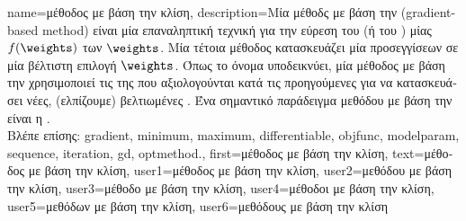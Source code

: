 {name={\foreignlanguage{greek}{μέθοδος με βάση την κλίση}}, 
	description={\foreignlanguage{greek}{Μία μέθοδς με βάση την} 
		 (gradient-based method) \foreignlanguage{greek}{είναι μία επαναληπτική τεχνική για την εύρεση του} 
		 (\foreignlanguage{greek}{ή του} ) \foreignlanguage{greek}{μίας} 
		  $f(\weights)$ \foreignlanguage{greek}{των}  $\weights$. 
		\foreignlanguage{greek}{Μία τέτοια μέθοδος κατασκευάζει μία}  \foreignlanguage{greek}{προσεγγίσεων 
		σε μία βέλτιστη επιλογή} $\weights$. \foreignlanguage{greek}{Όπως το όνομα υποδεικνύει,} \foreignlanguage{greek}{μία μέθοδος με 
		βάση την}  \foreignlanguage{greek}{χρησιμοποιεί τις}  \foreignlanguage{greek}{της} 
		 \foreignlanguage{greek}{που αξιολογούνται κατά τις προηγούμενες}  
		\foreignlanguage{greek}{για να κατασκευάσει νέες, (ελπίζουμε) βελτιωμένες} . 
		\foreignlanguage{greek}{Ένα σημαντικό παράδειγμα μεθόδου με βάση την}  
		\foreignlanguage{greek}{είναι η} .
		\\
		\foreignlanguage{greek}{Βλέπε επίσης:} \gls{gradient}, \gls{minimum}, \gls{maximum}, \gls{differentiable}, \gls{objfunc}, \gls{modelparam}, 
		\gls{sequence}, \gls{iteration}, \gls{gd}, \gls{optmethod}.},
	first={\foreignlanguage{greek}{μέθοδος με βάση την κλίση}},
	text={\foreignlanguage{greek}{μέθοδος με βάση την κλίση}},
	user1={\foreignlanguage{greek}{μέθοδος με βάση την κλίση}}, %
	user2={\foreignlanguage{greek}{μεθόδου με βάση την κλίση}}, %
	user3={\foreignlanguage{greek}{μέθοδο με βάση την κλίση}}, %
	user4={\foreignlanguage{greek}{μέθοδοι με βάση την κλίση}}, %
	user5={\foreignlanguage{greek}{μεθόδων με βάση την κλίση}}, %
	user6={\foreignlanguage{greek}{μεθόδους με βάση την κλίση}} %
}

